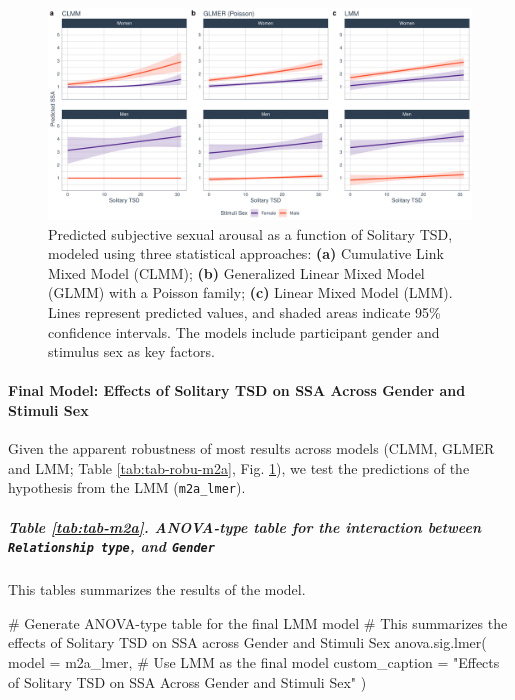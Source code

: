\documentclass[
  bookmarksnumbered]{article}
\newenvironment{Shaded}{\begin{snugshade}}{\end{snugshade}}
\newcommand{\AttributeTok}[1]{\textcolor[rgb]{0.80,0.80,0.80}{#1}}
\newcommand{\CommentTok}[1]{\textcolor[rgb]{0.50,0.62,0.50}{#1}}
\newcommand{\FunctionTok}[1]{\textcolor[rgb]{0.94,0.94,0.56}{#1}}
\newcommand{\NormalTok}[1]{\textcolor[rgb]{0.80,0.80,0.80}{#1}}
\newcommand{\StringTok}[1]{\textcolor[rgb]{0.80,0.58,0.58}{#1}}
\begin{document}
\begin{figure}
\centering
\includegraphics{Sexual_Desire_Arousal_anonymous_files/figure-latex/preds-m2a-1.pdf}
\caption{\label{fig:preds-m2a}Predicted subjective sexual arousal as a function of Solitary TSD, modeled using three statistical approaches: \textbf{(a)} Cumulative Link Mixed Model (CLMM); \textbf{(b)} Generalized Linear Mixed Model (GLMM) with a Poisson family; \textbf{(c)} Linear Mixed Model (LMM). Lines represent predicted values, and shaded areas indicate 95\% confidence intervals. The models include participant gender and stimulus sex as key factors.}
\end{figure}

\paragraph{Final Model: Effects of Solitary TSD on SSA Across Gender and Stimuli Sex}\label{final-model-effects-of-solitary-tsd-on-ssa-across-gender-and-stimuli-sex}

Given the apparent robustness of most results across models (CLMM, GLMER and LMM; Table \ref{tab:tab-robu-m2a}, Fig. \ref{fig:preds-m2a}), we test the predictions of the hypothesis from the LMM (\texttt{m2a\_lmer}).

\subparagraph{\texorpdfstring{Table \ref{tab:tab-m2a}. ANOVA-type table for the interaction between \texttt{Relationship\ type}, and \texttt{Gender}}{Table \ref{tab:tab-m2a}. ANOVA-type table for the interaction between Relationship type, and Gender}}\label{table-reftabtab-m2a.-anova-type-table-for-the-interaction-between-relationship-type-and-gender}

This tables summarizes the results of the model.

\begin{Shaded}
\begin{Highlighting}[]
\CommentTok{\# Generate ANOVA{-}type table for the final LMM model}
\CommentTok{\# This summarizes the effects of Solitary TSD on SSA across Gender and Stimuli Sex}
\FunctionTok{anova.sig.lmer}\NormalTok{(}
  \AttributeTok{model =}\NormalTok{ m2a\_lmer, }\CommentTok{\# Use LMM as the final model}
  \AttributeTok{custom\_caption =} \StringTok{"Effects of Solitary TSD on SSA Across Gender and Stimuli Sex"}
\NormalTok{)}
\end{Highlighting}
\end{Shaded}
\end{document}
